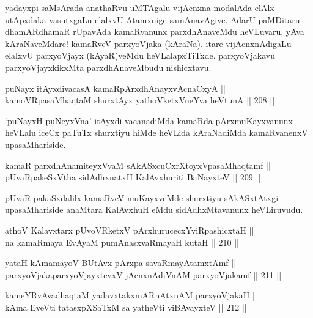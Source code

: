 \begin{artha}
yadayxpi saMsArada anathaRvu uMTAgalu vijAcnxna modalAda elAlx
utApxdaka vasutxgaLu elalxvU Atamxnige samAnavAgive. AdarU paMDitaru
dhamARdhamaR rUpavAda kamaRvanunx parxdhAnaveMdu heVLuvaru, yAva
kAraNaveMdare! kamaRveV parxyoVjaka (kAraNa). itare vijAcnxnAdigaLu
elalxvU parxyoVjayx (kAyaR)veMdu heVLalapxTiTxde. parxyoVjakavu
parxyoVjayxkikxMta parxdhAnaveMbudu nishicxtavu.
\end{artha}

\begin{shl}
puNayx itAyxdivacasA kamaRpArxdhAnayxvAcnaCxyA || \\
kamoVRpasaMhaqtaM shurxtAyx yathoVketxVneYva heVtunA ||  208 ||  
\end{shl}

\begin{artha}
`puNayxH puNeyxVna' itAyxdi vacanadiMda kamaRda pArxmuKayxvanunx
heVLalu iceCx paTuTx shurxtiyu hiMde heVLida kAraNadiMda
kamaRvanenxV upasaMhariside.
\end{artha}

\begin{shl}
kamaR parxdhAnamiteyxVvaM sAkASxcuCxrXtoyxVpasaMhaqtamf || \\
pUvaRpakeSxV\s tha sidAdhxnatxH KalAvxhuriti BaNayxteV ||  209 ||  
\end{shl}

\begin{artha}
pUvaR pakaSxdalilx kamaRveV muKayxveMde shurxtiyu sAkASxtAtxgi
upasaMhariside anaMtara KalAvxhuH eMdu sidAdhxMtavanunx heVLiruvudu.
\end{artha}


\begin{shl}
athoV Kalavxtarx pUvoVRketxV pArxhurucecxYviRpashicxtaH || \\
na kamaRmaya EvAyaM pumAnasxvaRmayaH kutaH ||  210 ||  
\end{shl}

\begin{shl}
yataH kAmamayoV BUtAvx pArxpa savaRmayAtamxtAmf || \\
parxyoVjakaparxyoVjayxtevxV jAcnxnAdiVnAM parxyoVjakamf ||  211 ||  
\end{shl}

\begin{shl}
kameYRvAvadhaqtaM yadavxtakxmARnAtxnAM parxyoVjakaH || \\
kAma EveVti tatasxpXSaTxM sa yatheVti viBAvayxteV ||  212 ||  
\end{shl}

